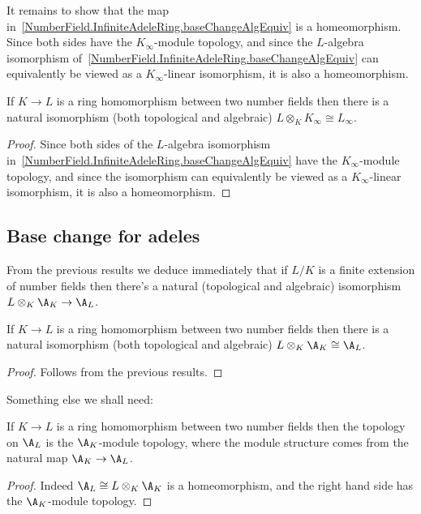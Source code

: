 It remains to show that the map in~\ref{NumberField.InfiniteAdeleRing.baseChangeAlgEquiv} is a
homeomorphism.
Since both sides have the $K_{\infty}$-module topology, and since the $L$-algebra isomorphism
of~\ref{NumberField.InfiniteAdeleRing.baseChangeAlgEquiv} can equivalently be viewed as a
$K_{\infty}$-linear isomorphism, it is also a homeomorphism.

\begin{theorem}
  \label{NumberField.InfiniteAdeleRing.baseChangeEquiv}
  \leanok
  If $K\to L$ is a ring homomorphism between two number fields then there is a natural isomorphism
  (both topological and algebraic) $L\otimes_KK_\infty\cong L_\infty$.
\end{theorem}
\begin{proof}
  Since both sides of the $L$-algebra isomorphism
  in~\ref{NumberField.InfiniteAdeleRing.baseChangeAlgEquiv} have the $K_{\infty}$-module topology,
  and since the isomorphism can equivalently be viewed as a $K_{\infty}$-linear isomorphism,
  it is also a homeomorphism.
\end{proof}


\subsection{Base change for adeles}

From the previous results we deduce immediately that if $L/K$ is a finite extension
of number fields then there's a natural (topological and algebraic) isomorphism
$L\otimes_K\A_K\to \A_L$.

\begin{theorem}
  \label{NumberField.AdeleRing.baseChangeEquiv}
  \leanok
  If $K\to L$ is a ring homomorphism between two number fields then there is a natural isomorphism
  (both topological and algebraic) $L\otimes_K\A_K\cong\A_L$.
\end{theorem}
\begin{proof}
  \leanok
  Follows from the previous results.
\end{proof}

Something else we shall need:

\begin{theorem}
  \label{NumberField.AdeleRing.baseChange_moduleTopology}
  \leanok
  If $K\to L$ is a ring homomorphism between two number fields then the topology on $\A_L$
  is the $\A_K$-module topology, where the module structure comes from the
  natural map $\A_K\to\A_L$.
\end{theorem}
\begin{proof}
  \leanok
  Indeed $\A_L\cong L\otimes_K\A_K$ is a homeomorphism, and
  the right hand side has the $\A_K$-module topology.
\end{proof}

